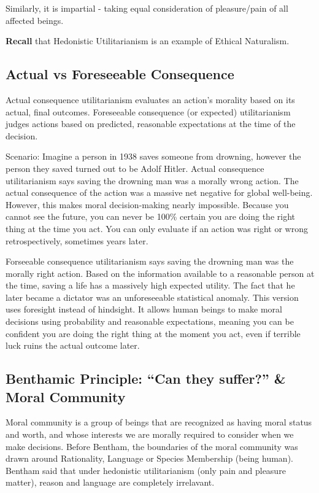\documentclass[12pt]{article}
\begin{document}
\noindent Similarly, it is impartial - taking equal consideration of pleasure/pain of all affected beings.

\noindent\textbf{Recall} that Hedonistic Utilitarianism is an example of Ethical Naturalism.

\subsection{Actual vs Foreseeable Consequence}
Actual consequence utilitarianism evaluates an action's morality based on its actual, final outcomes.
Foreseeable consequence (or expected) utilitarianism judges actions based on predicted, reasonable expectations at the time of the decision.

\noindent Scenario: Imagine a person in 1938 saves someone from drowning, however the person they saved turned out to be Adolf Hitler.
Actual consequence utilitarianism says saving the drowning man was a morally wrong action. The actual consequence of the action was a massive net negative for global well-being.
However, this makes moral decision-making nearly impossible. Because you cannot see the future, you can never be 100\% certain you are doing the right thing at the time you act. 
You can only evaluate if an action was right or wrong retrospectively, sometimes years later.

\noindent Forseeable consequence utilitarianism says saving the drowning man was the morally right action.
Based on the information available to a reasonable person at the time, saving a life has a massively high expected utility. The fact that he later became a dictator was an unforeseeable statistical anomaly.
This version uses foresight instead of hindsight. It allows human beings to make moral decisions using probability and reasonable expectations, meaning you can be confident you are doing the right thing at the moment you act, even if terrible luck ruins the actual outcome later.

\subsection{Benthamic Principle: ``Can they suffer?'' \& Moral Community}
Moral community is a group of beings that are recognized as having moral status and worth, and whose interests we are morally required to consider when we make decisions.
Before Bentham, the boundaries of the moral community was drawn around Rationality, Language or Species Membership (being human).
Bentham said that under hedonistic utilitarianism (only pain and pleasure matter), reason and language are completely irrelavant.
\end{document}
